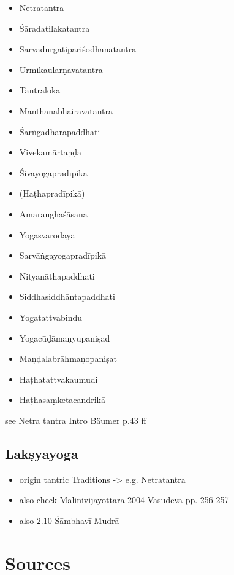 \begin{itemize}
\item Netratantra
\item Śāradatilakatantra
\item Sarvadurgatipariśodhanatantra
\item Ūrmikaulārṇavatantra
\item Tantrāloka
\item Manthanabhairavatantra
\item Śārṅgadhārapaddhati 
\item Vivekamārtaṇḍa
\item Śivayogapradīpikā
\item (Haṭhapradīpikā)
\item Amaraughaśāsana
\item Yogasvarodaya
\item Sarvāṅgayogapradīpikā
\item Nityanāthapaddhati  
\item Siddhasiddhāntapaddhati
\item Yogatattvabindu 
\item Yogacūḍāmaṇyupaniṣad
\item Maṇḍalabrāhmaṇopaniṣat
\item Haṭhatattvakaumudi
\item Haṭhasaṃketacandrikā
\end{itemize}

see Netra tantra Intro Bäumer p.43 ff

\section{Lakṣyayoga}

\begin{itemize}
\item origin tantric Traditions -> e.g. Netratantra
\item also check Mālinivijayottara 2004 Vasudeva pp. 256-257
\item also  2.10 Śāmbhavī Mudrā
  \end{itemize} 

\chapter{Sources}
